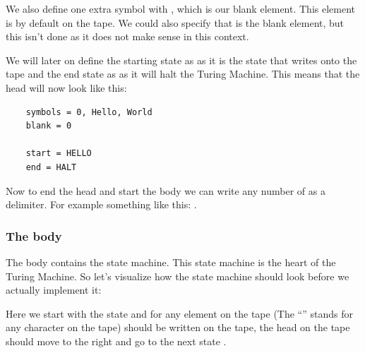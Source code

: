We also define one extra symbol with , which is our blank element. This element is by default on the tape. 
We could also specify that  is the blank element, but this isn't done as it does not make sense in this context.

We will later on define the starting state as  as it is the state that writes  onto the tape 
and the end state as  as it will halt the Turing Machine. This means that the head will now look like this:
\begin{verbatim}
    symbols = 0, Hello, World
    blank = 0
    
    start = HELLO
    end = HALT
\end{verbatim}

Now to end the head and start the body we can write any number of \code{-} as a delimiter. For example something like this: \code{----}.

\subsubsection{The body}
The body contains the state machine. This state machine is the heart of the Turing Machine. 
So let's visualize how the state machine should look before we actually implement it:

\begin{center}
\end{center}

Here we start with the  state and for any element on the tape (The ``\code{\_}'' stands for any character on the tape) 
 should be written on the tape, the head on the tape should move to the right and go to the next state .

